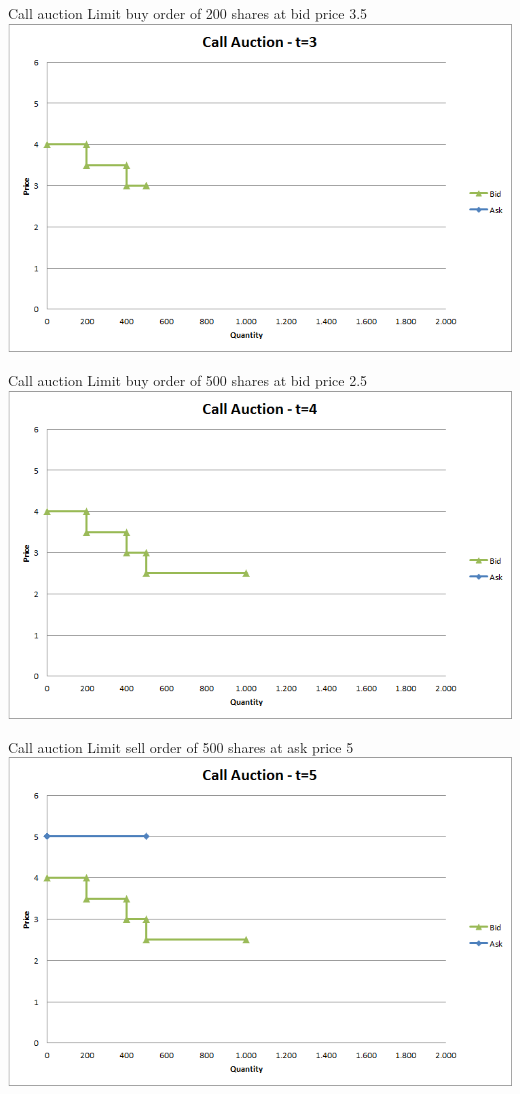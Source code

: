 \documentclass[english,10pt
,aspectratio=169
]{beamer}
\begin{document}
\begin{frame}{Call auction}
	Limit buy order of 200 shares at bid price 3.5
	\quad
	\center
	\includegraphics[width=.75\linewidth]{pics/Call_t3}
\end{frame}


\begin{frame}{Call auction}
	Limit buy order of 500 shares at bid price 2.5
	\quad
	\center
	\includegraphics[width=.75\linewidth]{pics/Call_t4}
\end{frame}


\begin{frame}{Call auction}
	Limit sell order of 500 shares at ask price 5
	\quad
	\center
	\includegraphics[width=.75\linewidth]{pics/Call_t5}
\end{frame}
\end{document}
